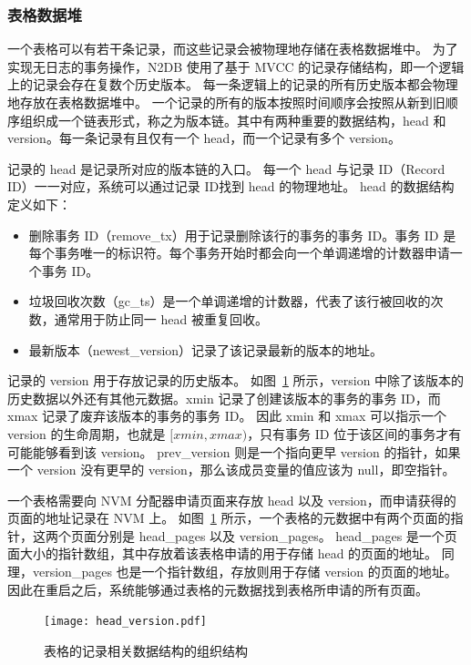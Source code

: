 \subsubsection{表格数据堆}

一个表格可以有若干条记录，而这些记录会被物理地存储在表格数据堆中。
为了实现无日志的事务操作，N2DB 使用了基于 MVCC 的记录存储结构，即一个逻辑上的记录会存在复数个历史版本。
每一条逻辑上的记录的所有历史版本都会物理地存放在表格数据堆中。
一个记录的所有的版本按照时间顺序会按照从新到旧顺序组织成一个链表形式，称之为版本链。其中有两种重要的数据结构，head 和 version。每一条记录有且仅有一个 head，而一个记录有多个 version。

记录的 head 是记录所对应的版本链的入口。
每一个 head 与记录 ID（Record ID）一一对应，系统可以通过记录 ID找到 head 的物理地址。
head 的数据结构定义如下：
\begin{itemize}
    \item 删除事务 ID（remove\_tx）用于记录删除该行的事务的事务 ID。事务 ID 是每个事务唯一的标识符。每个事务开始时都会向一个单调递增的计数器申请一个事务 ID。
    \item 垃圾回收次数（gc\_ts）是一个单调递增的计数器，代表了该行被回收的次数，通常用于防止同一 head 被重复回收。
    \item 最新版本（newest\_version）记录了该记录最新的版本的地址。
\end{itemize}

记录的 version 用于存放记录的历史版本。
如图~\ref{fig:table} 所示，version 中除了该版本的历史数据以外还有其他元数据。xmin 记录了创建该版本的事务的事务 ID，而 xmax 记录了废弃该版本的事务的事务 ID。
因此 xmin 和 xmax 可以指示一个 version 的生命周期，也就是 $[xmin, xmax)$，只有事务 ID 位于该区间的事务才有可能能够看到该 version。
prev\_version 则是一个指向更早 version 的指针，如果一个 version 没有更早的 version，那么该成员变量的值应该为 null，即空指针。

一个表格需要向 NVM 分配器申请页面来存放 head 以及 version，而申请获得的页面的地址记录在 NVM 上。
如图~\ref{fig:table} 所示，一个表格的元数据中有两个页面的指针，这两个页面分别是 head\_pages 以及 version\_pages。
head\_pages 是一个页面大小的指针数组，其中存放着该表格申请的用于存储 head 的页面的地址。
同理，version\_pages 也是一个指针数组，存放则用于存储 version 的页面的地址。
因此在重启之后，系统能够通过表格的元数据找到表格所申请的所有页面。

\begin{figure}
    \centering
    \texttt{[image: head\_version.pdf]}
    \caption{表格的记录相关数据结构的组织结构}
    \label{fig:table}
\end{figure}


